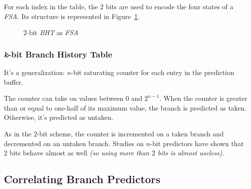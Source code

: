 \documentclass[english]{article}
\begin{document}
For each index in the table, the \(2\) bits are used to encode the four states of a \textit{FSA}.
Its structure is represented in Figure~\ref{fig:2-bit-BHT-as-FSA}.

\begin{figure}[htbp]
  \bigskip
  \centering


  \caption{\(2\)-bit \textit{BHT} as \textit{FSA}}
  \label{fig:2-bit-BHT-as-FSA}
  \bigskip
\end{figure}

\subsubsection{\textit{k}-bit Branch History Table}

It's a generalization: \(n\)-bit saturating counter for each entry in the prediction buffer.

The counter can take on values between \(0\) and \(2^{n-1}\).
When the counter is greater than or equal to one-half of its maximum value, the branch is predicted as taken.
Otherwise, it's predicted as untaken.

As in the \(2\)-bit scheme, the counter is incremented on a taken branch and decremented on an untaken branch.
Studies on \(n\)-bit predictors have shown that \(2\) bits behave almost as well \textit{(so using more than \(2\) bits is almost useless)}.

\subsection{Correlating Branch Predictors}
\end{document}
